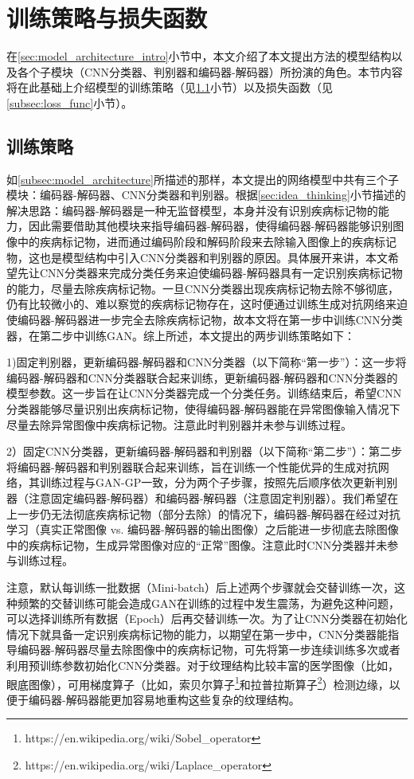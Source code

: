 \section{训练策略与损失函数}\label{sec:loss_func_training_stragies}
在\ref{sec:model_architecture_intro}小节中，本文介绍了本文提出方法的模型结构以及各个子模块（CNN分类器、判别器和编码器-解码器）所扮演的角色。本节内容将在此基础上介绍模型的训练策略（见\ref{subsec:traing_stragies}小节）以及损失函数（见\ref{subsec:loss_func}小节）。
\subsection{训练策略}\label{subsec:traing_stragies}
如\ref{subsec:model_architecture}所描述的那样，本文提出的网络模型中共有三个子模块：编码器-解码器、CNN分类器和判别器。根据\ref{sec:idea_thinking}小节描述的解决思路：编码器-解码器是一种无监督模型，本身并没有识别疾病标记物的能力，因此需要借助其他模块来指导编码器-解码器，使得编码器-解码器能够识别图像中的疾病标记物，进而通过编码阶段和解码阶段来去除输入图像上的疾病标记物，这也是模型结构中引入CNN分类器和判别器的原因。具体展开来讲，本文希望先让CNN分类器来完成分类任务来迫使编码器-解码器具有一定识别疾病标记物的能力，尽量去除疾病标记物。一旦CNN分类器出现疾病标记物去除不够彻底，仍有比较微小的、难以察觉的疾病标记物存在，这时便通过训练生成对抗网络来迫使编码器-解码器进一步完全去除疾病标记物，故本文将在第一步中训练CNN分类器，在第二步中训练GAN。综上所述，本文提出的两步训练策略如下：

1)固定判别器，更新编码器-解码器和CNN分类器（以下简称“第一步”）：这一步将编码器-解码器和CNN分类器联合起来训练，更新编码器-解码器和CNN分类器的模型参数。这一步旨在让CNN分类器完成一个分类任务。训练结束后，希望CNN分类器能够尽量识别出疾病标记物，使得编码器-解码器能在异常图像输入情况下尽量去除异常图像中疾病标记物。注意此时判别器并未参与训练过程。

2）固定CNN分类器，更新编码器-解码器和判别器（以下简称“第二步”）：第二步将编码器-解码器和判别器联合起来训练，旨在训练一个性能优异的生成对抗网络，其训练过程与GAN-GP一致，分为两个子步骤，按照先后顺序依次更新判别器（注意固定编码器-解码器）和编码器-解码器（注意固定判别器）。我们希望在上一步仍无法彻底疾病标记物（部分去除）的情况下，编码器-解码器在经过对抗学习（真实正常图像 vs. 编码器-解码器的输出图像）之后能进一步彻底去除图像中的疾病标记物，生成异常图像对应的“正常”图像。注意此时CNN分类器并未参与训练过程。

注意，默认每训练一批数据（Mini-batch）后上述两个步骤就会交替训练一次，这种频繁的交替训练可能会造成GAN在训练的过程中发生震荡，为避免这种问题，可以选择训练所有数据（Epoch）后再交替训练一次。为了让CNN分类器在初始化情况下就具备一定识别疾病标记物的能力，以期望在第一步中，CNN分类器能指导编码器-解码器尽量去除图像中的疾病标记物，可先将第一步连续训练多次或者利用预训练参数初始化CNN分类器。对于纹理结构比较丰富的医学图像（比如，眼底图像），可用梯度算子（比如，索贝尔算子\footnote{https://en.wikipedia.org/wiki/Sobel\_operator}和拉普拉斯算子\footnote{https://en.wikipedia.org/wiki/Laplace\_operator}）检测边缘，以便于编码器-解码器能更加容易地重构这些复杂的纹理结构。

